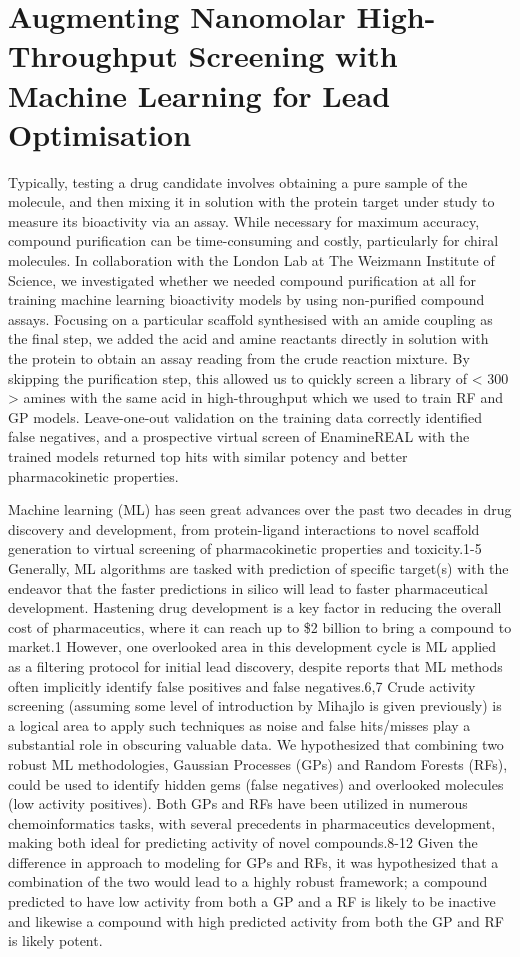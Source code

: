 \chapter{Augmenting Nanomolar High-Throughput Screening with Machine Learning for Lead Optimisation}\label{ch:testing}

Typically, testing a drug candidate involves obtaining a pure sample of the molecule, and then mixing it in solution with the protein target under study to measure its bioactivity via an assay. While necessary for maximum accuracy, compound purification can be time-consuming and costly, particularly for chiral molecules. In collaboration with the London Lab at The Weizmann Institute of Science, we investigated whether we needed compound purification at all for training machine learning bioactivity models by using non-purified compound assays. Focusing on a particular scaffold synthesised with an amide coupling as the final step, we added the acid and amine reactants directly in solution with the protein to obtain an assay reading from the crude reaction mixture. By skipping the purification step, this allowed us to quickly screen a library of < 300 > amines with the same acid in high-throughput which we used to train RF and GP models. Leave-one-out validation on the training data correctly identified false negatives, and a prospective virtual screen of EnamineREAL with the trained models returned top hits with similar potency and better pharmacokinetic properties.

Machine learning (ML) has seen great advances over the past two decades in drug discovery and development, from protein-ligand interactions to novel scaffold generation to virtual screening of pharmacokinetic properties and toxicity.1-5 Generally, ML algorithms are tasked with prediction of specific target(s) with the endeavor that the faster predictions in silico will lead to faster pharmaceutical development. Hastening drug development is a key factor in reducing the overall cost of pharmaceutics, where it can reach up to \$2 billion to bring a compound to market.1 However, one overlooked area in this development cycle is ML applied as a filtering protocol for initial lead discovery, despite reports that ML methods often implicitly identify false positives and false negatives.6,7 Crude activity screening (assuming some level of introduction by Mihajlo is given previously) is a logical area to apply such techniques as noise and false hits/misses play a substantial role in obscuring valuable data. We hypothesized that combining two robust ML methodologies, Gaussian Processes (GPs) and Random Forests (RFs), could be used to identify hidden gems (false negatives) and overlooked molecules (low activity positives). Both GPs and RFs have been utilized in numerous chemoinformatics tasks, with several precedents in pharmaceutics development, making both ideal for predicting activity of novel compounds.8-12 Given the difference in approach to modeling for GPs and RFs, it was hypothesized that a combination of the two would lead to a highly robust framework; a compound predicted to have low activity from both a GP and a RF is likely to be inactive and likewise a compound with high predicted activity from both the GP and RF is likely potent.

